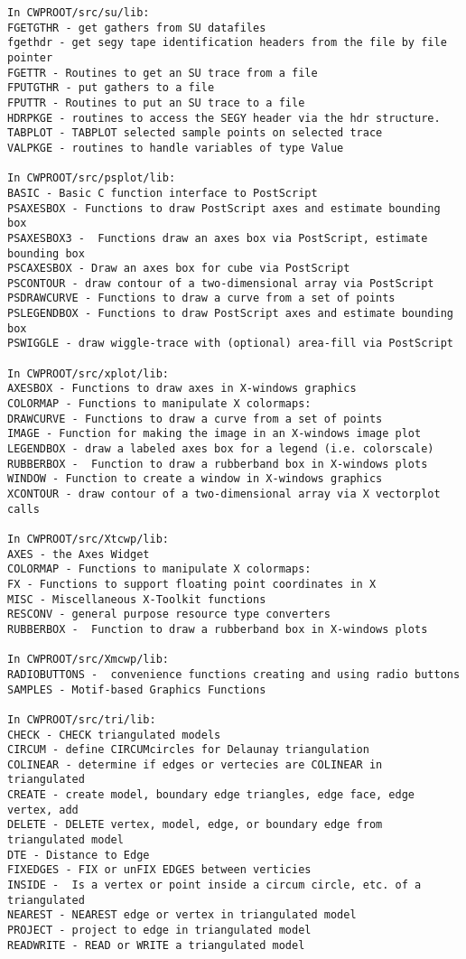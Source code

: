 {{\begin{verbatim}
In CWPROOT/src/su/lib:
FGETGTHR - get gathers from SU datafiles
fgethdr - get segy tape identification headers from the file by file pointer
FGETTR - Routines to get an SU trace from a file 
FPUTGTHR - put gathers to a file
FPUTTR - Routines to put an SU trace to a file 
HDRPKGE - routines to access the SEGY header via the hdr structure.
TABPLOT - TABPLOT selected sample points on selected trace
VALPKGE - routines to handle variables of type Value

In CWPROOT/src/psplot/lib:
BASIC - Basic C function interface to PostScript
PSAXESBOX - Functions to draw PostScript axes and estimate bounding box
PSAXESBOX3 -  Functions draw an axes box via PostScript, estimate bounding box
PSCAXESBOX - Draw an axes box for cube via PostScript
PSCONTOUR - draw contour of a two-dimensional array via PostScript
PSDRAWCURVE - Functions to draw a curve from a set of points
PSLEGENDBOX - Functions to draw PostScript axes and estimate bounding box
PSWIGGLE - draw wiggle-trace with (optional) area-fill via PostScript

In CWPROOT/src/xplot/lib:
AXESBOX - Functions to draw axes in X-windows graphics
COLORMAP - Functions to manipulate X colormaps:
DRAWCURVE - Functions to draw a curve from a set of points
IMAGE - Function for making the image in an X-windows image plot
LEGENDBOX - draw a labeled axes box for a legend (i.e. colorscale)
RUBBERBOX -  Function to draw a rubberband box in X-windows plots
WINDOW - Function to create a window in X-windows graphics
XCONTOUR - draw contour of a two-dimensional array via X vectorplot calls

In CWPROOT/src/Xtcwp/lib:
AXES - the Axes Widget
COLORMAP - Functions to manipulate X colormaps:
FX - Functions to support floating point coordinates in X
MISC - Miscellaneous X-Toolkit functions
RESCONV - general purpose resource type converters
RUBBERBOX -  Function to draw a rubberband box in X-windows plots

In CWPROOT/src/Xmcwp/lib:
RADIOBUTTONS -  convenience functions creating and using radio buttons
SAMPLES - Motif-based Graphics Functions

In CWPROOT/src/tri/lib:
CHECK - CHECK triangulated models
CIRCUM - define CIRCUMcircles for Delaunay triangulation
COLINEAR - determine if edges or vertecies are COLINEAR in triangulated
CREATE - create model, boundary edge triangles, edge face, edge vertex, add
DELETE - DELETE vertex, model, edge, or boundary edge from triangulated model
DTE - Distance to Edge
FIXEDGES - FIX or unFIX EDGES between verticies
INSIDE -  Is a vertex or point inside a circum circle, etc. of a triangulated
NEAREST - NEAREST edge or vertex in triangulated model
PROJECT - project to edge in triangulated model
READWRITE - READ or WRITE a triangulated model


\end{verbatim}}}
